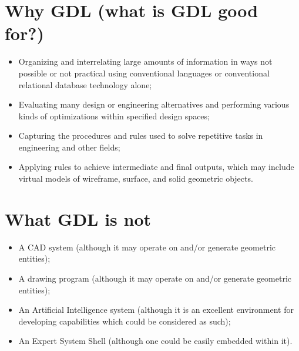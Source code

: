 \documentclass [11pt]{book}
\begin{document}
\section{Why GDL (what is GDL good for?)}

\label{sec:whygdl(whatisgdlgoodfor?)}



\begin{itemize}

\item Organizing and interrelating large amounts of information
in ways not possible or not practical using conventional languages or 
conventional relational database technology alone;

\item Evaluating many design or engineering alternatives and 
performing various kinds of optimizations within specified design
spaces;

\item Capturing the procedures and rules used to solve repetitive
tasks in engineering and other fields;

\item Applying rules to achieve intermediate and final 
outputs, which may include virtual models of wireframe, surface,
and solid geometric objects.

\end{itemize}



\section{What GDL is not}

\label{sec:whatgdlisnot}



\begin{itemize}

\item A CAD system (although it may operate on and/or generate geometric entities);

\item A drawing program (although it may operate on and/or generate geometric entities);

\item An Artificial Intelligence system (although it is an excellent environment for developing 
capabilities which could be considered as such);

\item An Expert System Shell (although one could be easily embedded within it).

\end{itemize}
\end{document}
